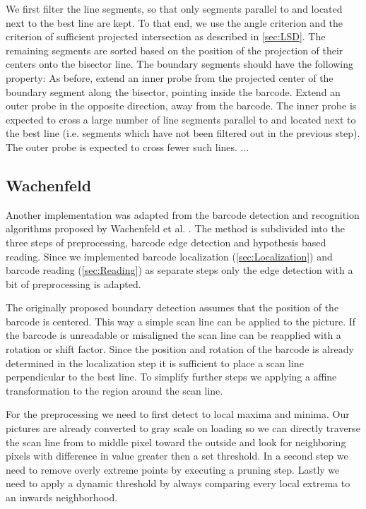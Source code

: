 We first filter the line segments, so that only segments parallel to and located
next to the best
line are kept. To that end, we use the angle criterion and the criterion of sufficient
projected intersection as described in \cref{sec:LSD}. The remaining segments
are sorted based on the position of the projection of their centers onto the
bisector line. The boundary segments should have the following property: As before,
extend an inner probe from the projected center of the boundary segment along the bisector, pointing inside the
barcode. Extend an outer probe in the opposite direction, away from the barcode.
The inner probe is expected to cross a large number of line segments parallel to
and located next to the best line (i.e. segments which have not been
filtered out in the previous step). The outer probe is expected to cross fewer
such lines.
...

\subsection[Wachenfeld]{Wachenfeld}
Another implementation was adapted from the barcode detection and recognition algorithms proposed by Wachenfeld et al. \cite{wachenfeld2008robust}. The method is subdivided into the three steps of preprocessing, barcode edge detection and hypothesis based reading. Since we implemented barcode localization (\cref{sec:Localization}) and barcode reading (\cref{sec:Reading}) as separate steps only the edge detection with a bit of preprocessing is adapted.

The originally proposed boundary detection assumes that the position of the barcode is centered. This way a simple scan line can be applied to the picture. If the barcode is unreadable or misaligned the scan line can be reapplied with a rotation or shift factor. Since the position and rotation of the barcode is already determined in the localization step it is sufficient to place a scan line perpendicular to the best line. To simplify further steps we applying a affine transformation to the region around the scan line.

For the preprocessing we need to first detect to local maxima and minima. Our pictures are already converted to gray scale on loading so we can directly traverse the scan line from to middle pixel toward the outside and look for neighboring pixels with difference in value greater then a set threshold. In a second step we need to remove overly extreme points by executing a pruning step. Lastly we need to apply a dynamic threshold by always comparing every local extrema to an inwards neighborhood.

